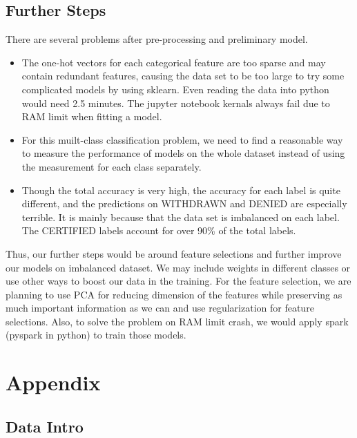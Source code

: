 \documentclass{article}
\begin{document}
\begin{multicols}{2}
\section{Further Steps}
There are several problems after pre-processing and preliminary model. 
\begin{itemize}
    \item The one-hot vectors for each categorical feature are too sparse and may contain redundant features, causing the data set to be too large to try some complicated models by using sklearn. Even reading the data into python would need 2.5 minutes. The jupyter notebook kernals always fail due to RAM limit when fitting a model. 
    \item For this muilt-class classification problem, we need to find a reasonable way to measure the performance of models on the whole dataset instead of using the measurement for each class separately. 
    \item Though the total accuracy is very high, the accuracy for each label is quite different, and the predictions on WITHDRAWN and DENIED are especially terrible. It is mainly because that the data set is imbalanced on each label. The CERTIFIED labels account for over 90\% of the total labels. 
\end{itemize}
Thus, our further steps would be around feature selections and further improve our models on imbalanced dataset. We may include weights in different classes or use other ways to boost our data  in the training. For the feature selection, we are planning to use PCA for reducing dimension of the features while preserving as much important information as we can and use regularization for feature selections. Also, to solve the problem on RAM limit crash, we would apply spark (pyspark in python) to train those models.
\end{multicols}
\newpage
\section{Appendix}
\subsection{Data Intro} \label{data_intro_sec}
\end{document}
